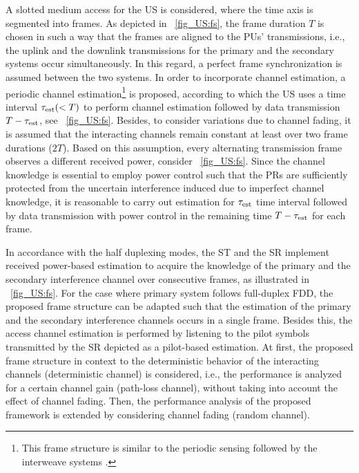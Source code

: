 A slotted medium access for the US is considered, where the time axis is segmented into frames. As depicted in \figurename~\ref{fig_US:fs}, the frame duration $T$ is chosen in such a way that the frames are aligned to the PUs' transmissions, i.e., the uplink and the downlink transmissions for the primary and the secondary systems occur simultaneously. In this regard, a perfect frame synchronization is assumed between the two systems. In order to incorporate channel estimation, a periodic channel estimation\footnote{This frame structure is similar to the periodic sensing followed by the interweave systems \cite{Liang08}.} is proposed, according to which the US uses a time interval $\tau_{\text{est}} (< T)$ to perform channel estimation followed by data transmission $T- \tau_{\text{est}}$, see \figurename~\ref{fig_US:fs}. Besides, to consider variations due to channel fading, it is assumed that the interacting channels remain constant at least over two frame durations ($2T$). Based on this assumption, every alternating transmission frame observes a different received power, consider \figurename~\ref{fig_US:fs}. Since the channel knowledge is essential to employ power control such that the PRs are sufficiently protected from the uncertain interference induced due to imperfect channel knowledge, it is reasonable to carry out estimation for $\tau_{\text{est}}$ time interval followed by data transmission with power control in the remaining time $T - \tau_{\text{est}}$ for each frame. %

In accordance with the half duplexing modes, the ST and the SR implement received power-based estimation to acquire the knowledge of the primary and the secondary interference channel over consecutive frames, as illustrated in \figurename~\ref{fig_US:fs}. For the case where primary system follows full-duplex FDD, the proposed frame structure can be adapted such that the estimation of the primary and the secondary interference channels occurs in a single frame. Besides this, the access channel estimation is performed by listening to the pilot symbols transmitted by the SR depicted as a pilot-based estimation. 
At first, the proposed frame structure in context to the deterministic behavior of the interacting channels (deterministic channel) is considered, i.e., the performance is analyzed for a certain channel gain (path-loss channel), without taking into account the effect of channel fading. Then, the performance analysis of the proposed framework is extended by considering channel fading (random channel). %



